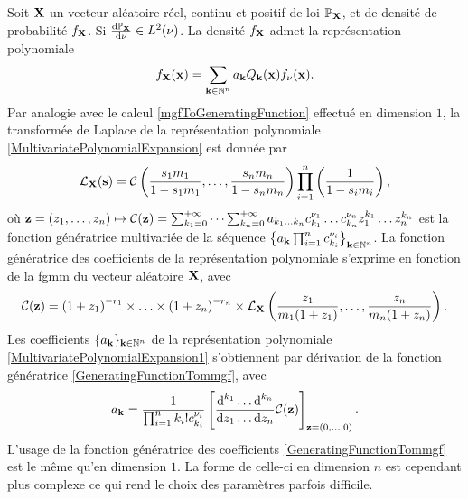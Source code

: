 Soit $\bold{X}$ un vecteur aléatoire réel, continu et positif de loi $\mathbb{P}_{\bold{X}}$, et de densité de probabilité $f_{\bold{X}}$. Si $\frac{\text{d}\mathbb{P}_{\bold{X}}}{\text{d}\nu}\in L^{2}(\nu)$. La densité $f_{\bold{X}}$ admet la représentation polynomiale
\begin{equation}\label{MultivariatePolynomialExpansion1}
f_{\bold{X}}(\bold{x})=\sum_{\bold{k}\in\mathbb{N}^{n}}a_{\bold{k}}Q_{\bold{k}}(\bold{x})f_{\nu}(\bold{x}).
\end{equation}
Par analogie avec le calcul \eqref{mgfToGeneratingFunction} effectué en dimension $1$, la transformée de Laplace de la représentation polynomiale \eqref{MultivariatePolynomialExpansion} est donnée par 
\begin{equation}\label{mmgfToGeneratingFunction}
\mathcal{L}_{\bold{X}}(\bold{s})=\mathcal{C}\left(\frac{s_{1}m_{1}}{1-s_{1}m_{1}},\ldots,\frac{s_{n}m_{n}}{1-s_{n}m_{n}}\right)\prod_{i=1}^{n}\left(\frac{1}{1-s_{i}m_{i}}\right),
\end{equation}
où $\bold{z}=(z_{1},\ldots,z_{n})\mapsto \mathcal{C}(\bold{z})=\sum_{k_{1}=0}^{+\infty}\cdots\sum_{k_{n}=0}^{+\infty}a_{k_{1}\ldots k_{n}}c^{\nu_{1}}_{k_{1}}\ldots c^{\nu_{n}}_{k_{n}}z_{1}^{k_{1}}\ldots z_{n}^{k_{n}}$ est la fonction génératrice multivariée de la séquence $\left\{a_{\bold{k}}\prod_{i=1}^{n}c^{\nu_{i}}_{k_{i}}\right\}_{\bold{k}\in\mathbb{N}^{n}}$. La fonction génératrice des coefficients de la représentation polynomiale s'exprime en fonction de la \gls{fgmm} du vecteur aléatoire $\bold{X}$, avec 
\begin{equation}\label{GeneratingFunctionTommgf}
\mathcal{C}(\bold{z})=\left(1+z_{1}\right)^{-r_{1}}\times\ldots\times\left(1+z_{n}\right)^{-r_{n}}\times\mathcal{L}_{\bold{X}}\left(\frac{z_{1}}{m_{1}(1+z_{1})},\ldots,\frac{z_{n}}{m_{n}(1+z_{n})}\right).
\end{equation}
Les coefficients $\{a_{\bold{k}}\}_{\bold{k}\in\mathbb{N}^{n}}$ de la représentation polynomiale \eqref{MultivariatePolynomialExpansion1} s'obtiennent par dérivation de la fonction génératrice  \eqref{GeneratingFunctionTommgf}, avec 
\begin{equation}\label{PolynomialExpansionCoefficientMultivariate}
a_{\bold{k}}=\frac{1}{\prod_{i=1}^{n}k_{i}!c^{\nu_{i}}_{k_{i}}}\left[\frac{\text{d}^{k_{1}}\ldots\text{d}^{k_{n}}}{\text{d}z_{1}\ldots\text{d}z_{n}}\mathcal{C}(\bold{z})\right]_{\bold{z}=(0,\ldots,0)}.
\end{equation}
L\rq{}usage de la fonction génératrice des coefficients \eqref{GeneratingFunctionTommgf} est le même qu\rq{}en dimension $1$. La forme de celle-ci en dimension $n$ est cependant plus complexe ce qui rend le choix des paramètres parfois difficile. 

